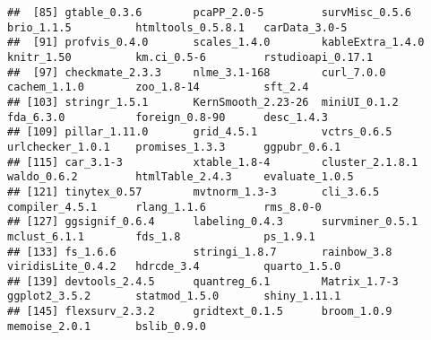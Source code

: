\documentclass[
]{article}
\begin{document}
\begin{verbatim}
##  [85] gtable_0.3.6        pcaPP_2.0-5         survMisc_0.5.6      brio_1.1.5          htmltools_0.5.8.1   carData_3.0-5      
##  [91] profvis_0.4.0       scales_1.4.0        kableExtra_1.4.0    knitr_1.50          km.ci_0.5-6         rstudioapi_0.17.1  
##  [97] checkmate_2.3.3     nlme_3.1-168        curl_7.0.0          cachem_1.1.0        zoo_1.8-14          sft_2.4            
## [103] stringr_1.5.1       KernSmooth_2.23-26  miniUI_0.1.2        fda_6.3.0           foreign_0.8-90      desc_1.4.3         
## [109] pillar_1.11.0       grid_4.5.1          vctrs_0.6.5         urlchecker_1.0.1    promises_1.3.3      ggpubr_0.6.1       
## [115] car_3.1-3           xtable_1.8-4        cluster_2.1.8.1     waldo_0.6.2         htmlTable_2.4.3     evaluate_1.0.5     
## [121] tinytex_0.57        mvtnorm_1.3-3       cli_3.6.5           compiler_4.5.1      rlang_1.1.6         rms_8.0-0          
## [127] ggsignif_0.6.4      labeling_0.4.3      survminer_0.5.1     mclust_6.1.1        fds_1.8             ps_1.9.1           
## [133] fs_1.6.6            stringi_1.8.7       rainbow_3.8         viridisLite_0.4.2   hdrcde_3.4          quarto_1.5.0       
## [139] devtools_2.4.5      quantreg_6.1        Matrix_1.7-3        ggplot2_3.5.2       statmod_1.5.0       shiny_1.11.1       
## [145] flexsurv_2.3.2      gridtext_0.1.5      broom_1.0.9         memoise_2.0.1       bslib_0.9.0
\end{verbatim}
\end{document}
